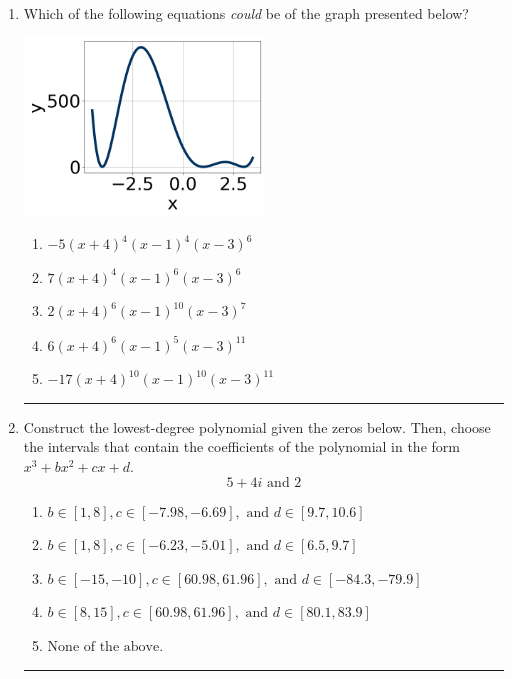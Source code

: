 \documentclass[14pt]{extbook}
\newcommand{\litem}[1]{\item#1\hspace*{-1cm}\rule{\textwidth}{0.4pt}}
\begin{document}
\begin{enumerate}
\litem{
Which of the following equations \textit{could} be of the graph presented below?
\begin{center}
    \includegraphics[width=0.5\textwidth]{../Figures/polyGraphToFunctionA.png}
\end{center}
\begin{enumerate}[label=\Alph*.]
\item \( -5(x + 4)^{4} (x - 1)^{4} (x - 3)^{6} \)
\item \( 7(x + 4)^{4} (x - 1)^{6} (x - 3)^{6} \)
\item \( 2(x + 4)^{6} (x - 1)^{10} (x - 3)^{7} \)
\item \( 6(x + 4)^{6} (x - 1)^{5} (x - 3)^{11} \)
\item \( -17(x + 4)^{10} (x - 1)^{10} (x - 3)^{11} \)

\end{enumerate} }
\litem{
Construct the lowest-degree polynomial given the zeros below. Then, choose the intervals that contain the coefficients of the polynomial in the form $x^3+bx^2+cx+d$.\[ 5 + 4 i \text{ and } 2 \]\begin{enumerate}[label=\Alph*.]
\item \( b \in [1, 8], c \in [-7.98, -6.69], \text{ and } d \in [9.7, 10.6] \)
\item \( b \in [1, 8], c \in [-6.23, -5.01], \text{ and } d \in [6.5, 9.7] \)
\item \( b \in [-15, -10], c \in [60.98, 61.96], \text{ and } d \in [-84.3, -79.9] \)
\item \( b \in [8, 15], c \in [60.98, 61.96], \text{ and } d \in [80.1, 83.9] \)
\item \( \text{None of the above.} \)


\end{enumerate}}
\end{enumerate}
\end{document}
